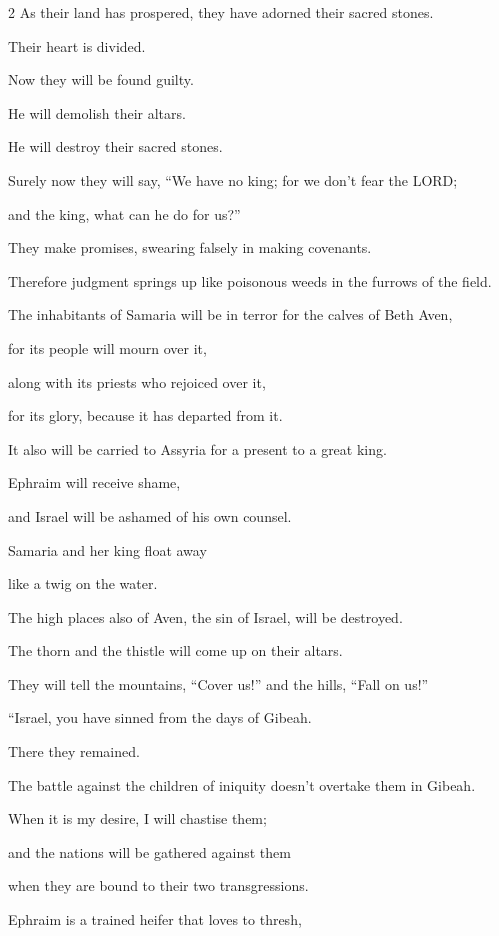 \begin{multicols}{2}
As their land has prospered, they have adorned their sacred stones.

\myverse{}Their heart is divided.

Now they will be found guilty.

He will demolish their altars.

He will destroy their sacred stones.

\myverse{}Surely now they will say, “We have no king; for we don’t fear
the LORD;

and the king, what can he do for us?”

\myverse{}They make promises, swearing falsely in making covenants.

Therefore judgment springs up like poisonous weeds in the furrows of the field.

\myverse{}The inhabitants of Samaria will be in terror for the calves of
Beth Aven,

for its people will mourn over it,

along with its priests who rejoiced over it,

for its glory, because it has departed from it.

\myverse{}It also will be carried to Assyria for a present to a great king.

Ephraim will receive shame,

and Israel will be ashamed of his own counsel.

\myverse{}Samaria and her king float away

like a twig on the water.

\myverse{}The high places also of Aven, the sin of Israel, will be destroyed.

The thorn and the thistle will come up on their altars.

They will tell the mountains, “Cover us!” and the hills, “Fall on us!”


\vspace{\baselineskip} \myverse{}“Israel, you have sinned from the days of Gibeah.

There they remained.

The battle against the children of iniquity doesn’t overtake them in Gibeah.

\myverse{}When it is my desire, I will chastise them;

and the nations will be gathered against them

when they are bound to their two transgressions.

\myverse{}Ephraim is a trained heifer that loves to thresh,


\end{multicols}
